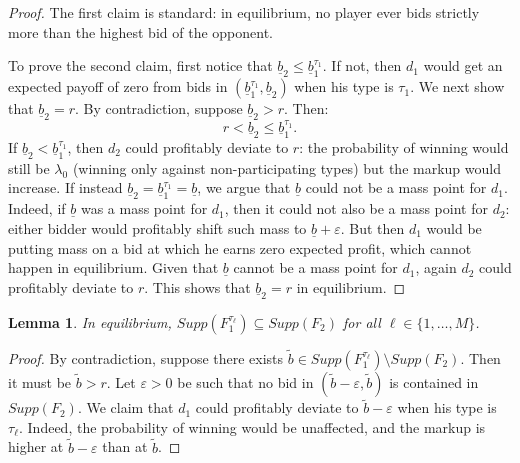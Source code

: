 \documentclass[11pt]{article}
\theoremstyle{plain}
\theoremstyle{definition}
\theoremstyle{plain}
\theoremstyle{plain}
\theoremstyle{plain}
\newtheorem{lem}[thm]{Lemma}
\theoremstyle{plain}
\numberwithin{equation}{section}
\begin{document}
\begin{proof}
The first claim is standard: in equilibrium, no player ever bids strictly more than the highest bid of the opponent.

\noindent To prove the second claim, first notice that $\underline{b}_2 \leq \underline{b}_1^{\tau_1}$. If not, then $d_1$ would get an expected payoff of zero from bids in $(\underline{b}_1^{\tau_1}, \underline{b}_2)$ when his type is $\tau_1$. We next show that $\underline{b}_2 = r$. By contradiction, suppose $\underline{b}_2 > r$. Then:
\[
r < \underline{b}_2 \leq \underline{b}_1^{\tau_1}.
\]
If $\underline{b}_2 < \underline{b}_1^{\tau_1}$, then $d_2$ could profitably deviate to $r$: the probability of winning would still be $\lambda_0$ (winning only against non-participating types) but the markup would increase. If instead $\underline{b}_2 = \underline{b}_1^{\tau_1} = \underline{b}$, we argue that $\underline{b}$ could not be a mass point for $d_1$. Indeed, if $\underline{b}$ was a mass point for $d_1$, then it could not also be a mass point for $d_2$: either bidder would profitably shift such mass to $\underline{b} + \varepsilon$. But then $d_1$ would be putting mass on a bid at which he earns zero expected profit, which cannot happen in equilibrium. Given that $\underline{b}$ cannot be a mass point for $d_1$, again $d_2$ could profitably deviate to $r$. This shows that $\underline{b}_2 = r$ in equilibrium.
\end{proof}

\vspace{0.4cm}

\begin{lem}\label{lem:N-inclusion}
In equilibrium, $Supp(F_1^{\tau_\ell}) \subseteq Supp(F_2)$ for all $\ell \in \{1, \ldots, M\}$.
\end{lem}

\begin{proof}
By contradiction, suppose there exists $\tilde{b} \in Supp(F_1^{\tau_\ell}) \setminus Supp(F_2)$. Then it must be $\tilde{b} > r$. Let $\varepsilon > 0$ be such that no bid in $(\tilde{b} - \varepsilon, \tilde{b})$ is contained in $Supp(F_2)$. We claim that $d_1$ could profitably deviate to $\tilde{b} - \varepsilon$ when his type is $\tau_\ell$. Indeed, the probability of winning would be unaffected, and the markup is higher at $\tilde{b} - \varepsilon$ than at $\tilde{b}$.
\end{proof}

\vspace{0.4cm}
\end{document}
